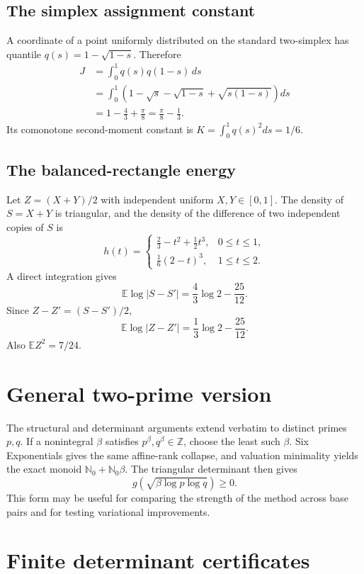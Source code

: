 \documentclass[11pt,oneside]{article}
\theoremstyle{definition}
\theoremstyle{remark}
\newcommand{\Nzero}{\mathbb N_0}
\newcommand{\Z}{\mathbb Z}
\newcommand{\E}{\mathbb E}
\begin{document}
\subsection{The simplex assignment constant}

A coordinate of a point uniformly distributed on the standard two-simplex has
quantile $q(s)=1-\sqrt{1-s}$.  Therefore
\begin{align*}
 J&=\int_0^1q(s)q(1-s)\,ds\\
 &=\int_0^1\left(1-\sqrt s-\sqrt{1-s}+\sqrt{s(1-s)}\right)ds\\
 &=1-\frac43+\frac\pi8
 =\frac\pi8-\frac13.
\end{align*}
Its comonotone second-moment constant is
$K=\int_0^1q(s)^2ds=1/6$.

\subsection{The balanced-rectangle energy}

Let $Z=(X+Y)/2$ with independent uniform $X,Y\in[0,1]$.  The density of
$S=X+Y$ is triangular, and the density of the difference of two independent
copies of $S$ is
\[
 h(t)=
 \begin{cases}
  \frac23-t^2+\frac12t^3,&0\le t\le1,\\
  \frac16(2-t)^3,&1\le t\le2.
 \end{cases}
\]
A direct integration gives
\[
 \E\log|S-S'|=\frac43\log2-\frac{25}{12}.
\]
Since $Z-Z'=(S-S')/2$,
\[
 \E\log|Z-Z'|=\frac13\log2-\frac{25}{12}.
\]
Also $\E Z^2=7/24$.

\section{General two-prime version}

The structural and determinant arguments extend verbatim to distinct primes
$p,q$.  If a nonintegral $\beta$ satisfies $p^\beta,q^\beta\in\Z$, choose the
least such $\beta$.  Six Exponentials gives the same affine-rank collapse, and
valuation minimality yields the exact monoid $\Nzero+\Nzero\beta$.  The
triangular determinant then gives
\[
 g\!\left(\sqrt{\beta\log p\log q}\right)\ge0.
\]
This form may be useful for comparing the strength of the method across base
pairs and for testing variational improvements.

\section{Finite determinant certificates}
\end{document}
